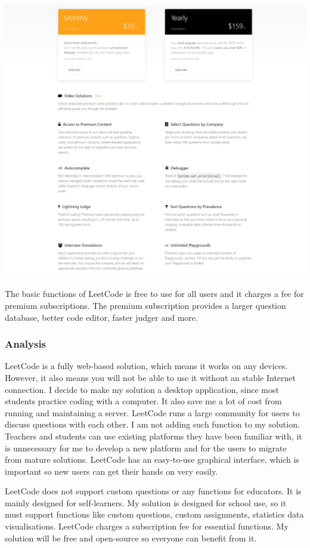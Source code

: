 \documentclass[a4paper]{report}
\begin{document}
\includegraphics[width=\linewidth]{LeetCode-Premium}

The basic functions of LeetCode is free to use for all users and it charges a fee for premium subscriptions. The premium subscription provides a larger question database, better code editor, faster judger and more.

\subsubsection{Analysis}

LeetCode is a fully web-based solution, which means it works on any devices. However, it also means you will not be able to use it without an stable Internet connection. I decide to make my solution a desktop application, since most students practice coding with a computer. It also save me a lot of cost from running and maintaining a server. LeetCode runs a large community for users to discuss questions with each other. I am not adding such function to my solution. Teachers and students can use existing platforms they have been familiar with, it is unnecessary for me to develop a new platform and for the users to migrate from mature solutions. LeetCode has an easy-to-use graphical interface, which is important so new users can get their hands on very easily. 

LeetCode does not support custom questions or any functions for educators. It is mainly designed for self-learners. My solution is designed for school use, so it must support functions like custom questions, custom assignments, statistics data visualisations. LeetCode charges a subscription fee for essential functions. My solution will be free and open-source so everyone can benefit from it.
\end{document}
